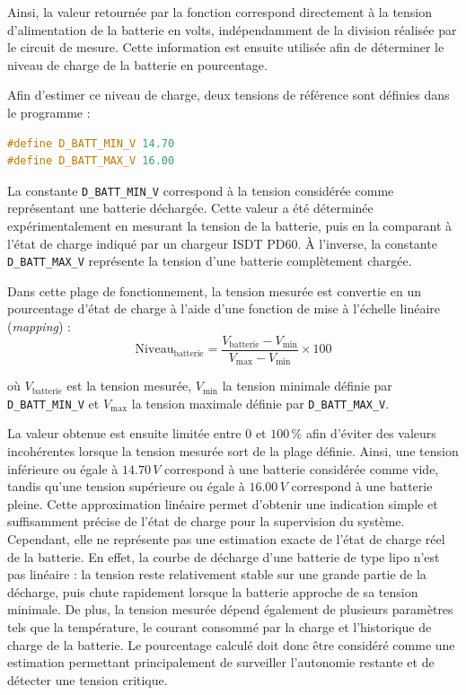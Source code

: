 Ainsi, la valeur retournée par la fonction correspond directement à la tension d'alimentation de la batterie en volts, indépendamment de la division réalisée par le circuit de mesure. Cette information est ensuite utilisée afin de déterminer le niveau de charge de la batterie en pourcentage.

Afin d'estimer ce niveau de charge, deux tensions de référence sont définies dans le programme :

\begin{lstlisting}[language=C++]
#define D_BATT_MIN_V 14.70
#define D_BATT_MAX_V 16.00
\end{lstlisting}
La constante \texttt{D\_BATT\_MIN\_V} correspond à la tension considérée comme représentant une batterie déchargée. Cette valeur a été déterminée expérimentalement en mesurant la tension de la batterie, puis en la comparant à l'état de charge indiqué par un chargeur ISDT PD60. À l'inverse, la constante \texttt{D\_BATT\_MAX\_V} représente la tension d'une batterie complètement chargée.

Dans cette plage de fonctionnement, la tension mesurée est convertie en un pourcentage d'état de charge à l'aide d'une fonction de mise à l'échelle linéaire (\textit{mapping}) :
$$
\mathrm{Niveau}_{\mathrm{batterie}} =
\frac{V_{\mathrm{batterie}}-V_{\mathrm{min}}}
{V_{\mathrm{max}}-V_{\mathrm{min}}}
\times 100
$$

où $V_{\mathrm{batterie}}$ est la tension mesurée, $V_{\mathrm{min}}$ la tension minimale définie par \texttt{D\_BATT\_MIN\_V} et $V_{\mathrm{max}}$ la tension maximale définie par \texttt{D\_BATT\_MAX\_V}.

La valeur obtenue est ensuite limitée entre $0$ et $100\,\%$ afin d'éviter des valeurs incohérentes lorsque la tension mesurée sort de la plage définie. Ainsi, une tension inférieure ou égale à $14.70\,V$ correspond à une batterie considérée comme vide, tandis qu'une tension supérieure ou égale à $16.00\,V$ correspond à une batterie pleine.
Cette approximation linéaire permet d'obtenir une indication simple et suffisamment précise de l'état de charge pour la supervision du système. Cependant, elle ne représente pas une estimation exacte de l'état de charge réel de la batterie. En effet, la courbe de décharge d'une batterie de type \acrshort{lipo} n'est pas linéaire : la tension reste relativement stable sur une grande partie de la décharge, puis chute rapidement lorsque la batterie approche de sa tension minimale. De plus, la tension mesurée dépend également de plusieurs paramètres tels que la température, le courant consommé par la charge et l'historique de charge de la batterie. Le pourcentage calculé doit donc être considéré comme une estimation permettant principalement de surveiller l'autonomie restante et de détecter une tension critique.


